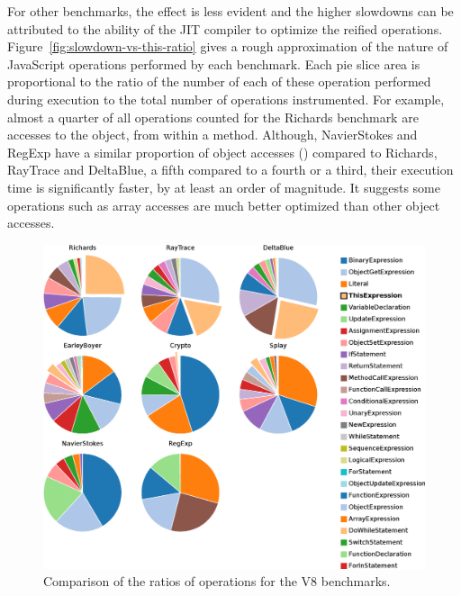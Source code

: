 For other benchmarks, the effect is less evident and the higher slowdowns can
be attributed to the ability of the JIT compiler to optimize the reified
operations.  Figure~\ref{fig:slowdown-vs-this-ratio} gives a rough
approximation of the nature of JavaScript operations performed by each
benchmark. Each pie slice area is proportional to the ratio of the number of
each of these operation performed during execution to the total number of
operations instrumented. For example, almost a quarter of all operations
counted for the Richards benchmark are accesses to the  object, from
within a method. Although, NavierStokes and RegExp have a similar proportion of
object accesses () compared to Richards, RayTrace and
DeltaBlue, a fifth compared to a fourth or a third, their execution time is
significantly faster, by at least an order of magnitude. It suggests some
operations such as array accesses are much better optimized than other object
accesses.

\begin{figure}[htbp]
\begin{center}
\includegraphics[width=.80\textwidth]{figures/benchmarkOperationRatios}
\caption[Ratios of operations for V8 benchmarks]{Comparison of the ratios of operations for the V8 benchmarks.}
\label{fig:operation-ratios}
\end{center}
\end{figure}

